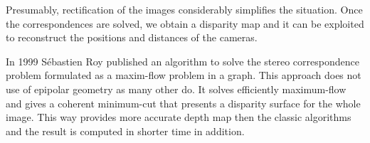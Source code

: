 Presumably, rectification of the images considerably simplifies the situation. 
Once the correspondences are solved, we obtain a disparity map and it can be exploited to reconstruct the positions and distances of the cameras.


In 1999 Sébastien Roy published an algorithm \cite{roy1998} \cite{roy1999} to solve the stereo correspondence problem formulated as a maxim-flow problem in a graph.
This approach does not use of epipolar geometry as many other do.
It solves efficiently maximum-flow and gives a coherent minimum-cut that presents a disparity surface for the whole image.
This way provides more accurate depth map then the classic algorithms and the result is computed in shorter time in addition.



